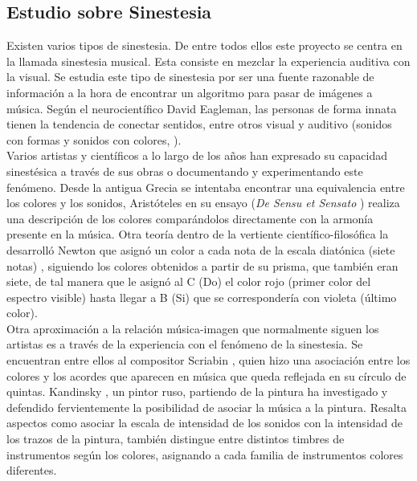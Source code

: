 \subsection{Estudio sobre Sinestesia}
\label{subsubsec:estudioSinestesia}


Existen varios tipos de sinestesia. De entre todos ellos este proyecto se centra en la llamada sinestesia musical. Esta consiste en mezclar la experiencia auditiva con la visual. Se estudia este tipo de sinestesia por ser una fuente razonable de información a la hora de encontrar un algoritmo para pasar de imágenes a música. Según el neurocientífico David Eagleman, las personas de forma innata tienen la tendencia de conectar sentidos, entre otros visual y auditivo (sonidos con formas y sonidos con colores, \cite{VideoRedesFliparColores}).\\

Varios artistas y científicos a lo largo de los años han expresado su capacidad sinestésica a través de sus obras o documentando y experimentando este fenómeno. Desde la antigua Grecia se intentaba encontrar una equivalencia entre los colores y los sonidos, Aristóteles en su ensayo (\emph{De Sensu et Sensato} \cite{DeSensuEtSensato}) realiza una descripción de los colores comparándolos directamente con la armonía presente en la música. Otra teoría dentro de la vertiente científico-filosófica la desarrolló Newton que asignó un color a cada nota de la escala diatónica (siete notas) \cite{OpticksNewton}, siguiendo los colores obtenidos a partir de su prisma, que también eran siete, de tal manera que le asignó al C (Do) el color rojo (primer color del espectro visible) hasta llegar a B (Si) que se correspondería con violeta (último color).\\ 

Otra aproximación a la relación música-imagen que normalmente siguen los artistas es a través de la experiencia con el fenómeno de la sinestesia. Se encuentran entre ellos al compositor Scriabin \cite{ScriabinQuintasColor}, quien hizo una asociación entre los colores y los acordes que aparecen en música que queda reflejada en su círculo de quintas. Kandinsky \cite{ConcerningSpiritualArt}, un pintor ruso, partiendo de la pintura ha investigado y defendido fervientemente la posibilidad de asociar la música a la pintura. Resalta aspectos como asociar la escala de intensidad de los sonidos con la intensidad de los trazos de la pintura, también distingue entre distintos timbres de instrumentos según los colores, asignando a cada familia de instrumentos colores diferentes.\\

